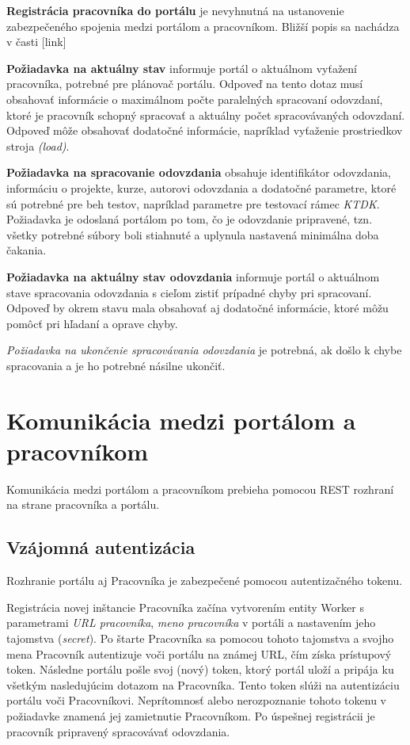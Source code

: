 \documentclass[
  digital, %
  twoside, %
  table,   %
  lof,     %
  lot,     %
]{fithesis3}
\begin{document}
\textbf{Registrácia pracovníka do portálu} je nevyhnutná na ustanovenie zabezpečeného spojenia medzi portálom a pracovníkom. Bližší popis sa nachádza v časti [link]

\textbf{Požiadavka na aktuálny stav} informuje portál o aktuálnom vyťažení pracovníka, potrebné pre plánovač portálu. Odpoveď na tento dotaz musí obsahovať informácie o maximálnom počte paralelných spracovaní odovzdaní, ktoré je pracovník schopný spracovať a aktuálny počet spracovávaných odovzdaní. Odpoveď môže obsahovať dodatočné informácie, napríklad vyťaženie prostriedkov stroja \emph{(load)}.

\textbf{Požiadavka na spracovanie odovzdania} obsahuje identifikátor odovzdania, informáciu o projekte, kurze, autorovi odovzdania a dodatočné parametre, ktoré sú potrebné pre beh testov, napríklad parametre pre testovací rámec \emph{KTDK}. Požiadavka je odoslaná portálom po tom, čo je odovzdanie pripravené, tzn. všetky potrebné súbory boli stiahnuté a uplynula nastavená minimálna doba čakania.

\textbf{Požiadavka na aktuálny stav odovzdania} informuje portál o aktuálnom stave spracovania odovzdania s cieľom zistiť prípadné chyby pri spracovaní. Odpoveď by okrem stavu mala obsahovať aj dodatočné informácie, ktoré môžu pomôcť pri hľadaní a oprave chyby.

\emph{Požiadavka na ukončenie spracovávania odovzdania} je potrebná, ak došlo k chybe spracovania a je ho potrebné násilne ukončiť.

\section{Komunikácia medzi portálom a pracovníkom}

Komunikácia medzi portálom a pracovníkom prebieha pomocou REST rozhraní na strane pracovníka a portálu. 

\subsection{Vzájomná autentizácia}

Rozhranie portálu aj Pracovníka je zabezpečené pomocou autentizačného tokenu. 

Registrácia novej inštancie Pracovníka začína vytvorením entity Worker s parametrami \emph{URL pracovníka}, \emph {meno pracovníka} v portáli a nastavením jeho tajomstva (\emph{secret}). Po štarte Pracovníka sa pomocou tohoto tajomstva a svojho mena Pracovník autentizuje voči portálu na známej URL, čím získa prístupový token. Následne portálu pošle svoj (nový) token, ktorý portál uloží a pripája ku všetkým nasledujúcim dotazom na Pracovníka. Tento token slúži na autentizáciu portálu voči Pracovníkovi. Neprítomnosť alebo nerozpoznanie tohoto tokenu v požiadavke znamená jej zamietnutie Pracovníkom. Po úspešnej registrácii je pracovník pripravený spracovávať odovzdania.
\end{document}
